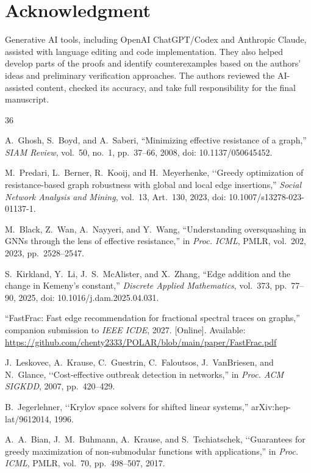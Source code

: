 \documentclass[conference]{IEEEtran}
\theoremstyle{definition}
\begin{document}
\section*{Acknowledgment}
Generative AI tools, including OpenAI ChatGPT/Codex and Anthropic
Claude, assisted with language editing and code implementation.
They also helped develop parts of the proofs and identify
counterexamples based on the authors' ideas and preliminary
verification approaches. The authors reviewed the AI-assisted
content, checked its accuracy, and take full responsibility
for the final manuscript.



\begin{thebibliography}{36}

A.~Ghosh, S.~Boyd, and A.~Saberi,
``Minimizing effective resistance of a graph,''
\emph{SIAM Review}, vol.~50, no.~1,
pp.~37--66, 2008, doi: 10.1137/050645452.

M.~Predari, L.~Berner, R.~Kooij, and H.~Meyerhenke,
\lq\lq{}Greedy optimization of resistance-based graph robustness with global and local edge insertions,''
\emph{Social Network Analysis and Mining}, vol.~13, Art.~130, 2023,
doi: 10.1007/s13278-023-01137-1.

M.~Black, Z.~Wan, A.~Nayyeri, and Y.~Wang,
``Understanding oversquashing in GNNs through the lens of effective resistance,''
in \emph{Proc. ICML}, PMLR, vol.~202, 2023, pp.~2528--2547.

S.~Kirkland, Y.~Li, J.~S.~McAlister, and X.~Zhang,
``Edge addition and the change in Kemeny's constant,''
\emph{Discrete Applied Mathematics}, vol.~373,
pp.~77--90, 2025, doi: 10.1016/j.dam.2025.04.031.

``FastFrac: Fast edge recommendation for fractional spectral traces
on graphs,'' companion submission to \emph{IEEE ICDE}, 2027. [Online]. Available:
\url{https://github.com/chenty2333/POLAR/blob/main/paper/FastFrac.pdf}

J.~Leskovec, A.~Krause, C.~Guestrin, C.~Faloutsos,
J.~VanBriesen, and N.~Glance,
\lq\lq{}Cost-effective outbreak detection in networks,''
in \emph{Proc. ACM SIGKDD}, 2007, pp.~420--429.

B.~Jegerlehner,
\lq\lq{}Krylov space solvers for shifted linear systems,''
arXiv:hep-lat/9612014, 1996.

A.~A.~Bian, J.~M.~Buhmann, A.~Krause, and S.~Tschiatschek,
\lq\lq{}Guarantees for greedy maximization of non-submodular functions with applications,''
in \emph{Proc. ICML}, PMLR, vol.~70, pp.~498--507, 2017.


\end{thebibliography}
\end{document}
